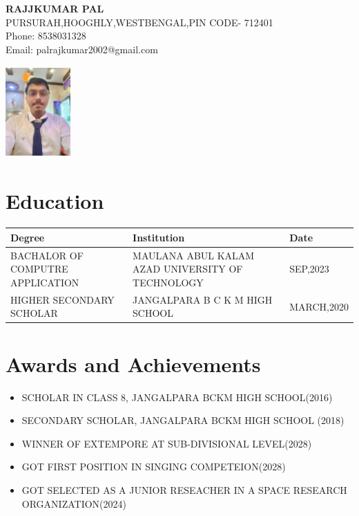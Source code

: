 \documentclass[a4paper,10pt]{article}
\begin{document}
\begin{minipage}{0.7\textwidth}
    \textbf{\LARGE RAJJKUMAR PAL} \\
    PURSURAH,HOOGHLY,WESTBENGAL,PIN CODE- 712401 \\
    Phone: 8538031328 \\
    Email: palrajkumar2002@gmail.com
\end{minipage}
\begin{minipage}{0.3\textwidth}
    \begin{flushright}
        \includegraphics[width=2.5cm,height=3.5cm]{resume pic.jpg}
    \end{flushright}
\end{minipage}

\vspace{1cm}

\section*{Education}
\begin{tabular}{|p{5cm}|p{6cm}|p{4cm}|}
    \hline
    \textbf{Degree} & \textbf{Institution} & \textbf{Date} \\
    \hline
    BACHALOR OF COMPUTRE APPLICATION & MAULANA ABUL KALAM AZAD UNIVERSITY OF TECHNOLOGY & SEP,2023\\
    \hline
    HIGHER SECONDARY SCHOLAR  & JANGALPARA B C K M HIGH SCHOOL & MARCH,2020 \\
    \hline
\end{tabular}

\vspace{1cm}

\section*{Awards and Achievements}
\begin{itemize}
    \item SCHOLAR IN CLASS 8, JANGALPARA BCKM HIGH SCHOOL(2016) 
    \item SECONDARY SCHOLAR, JANGALPARA BCKM HIGH SCHOOL (2018)
    \item WINNER OF EXTEMPORE AT SUB-DIVISIONAL LEVEL(2028)
    \item GOT FIRST POSITION IN SINGING COMPETEION(2028)
    \item GOT SELECTED AS A JUNIOR RESEACHER IN A SPACE RESEARCH ORGANIZATION(2024)
\end{itemize}
\end{document}
